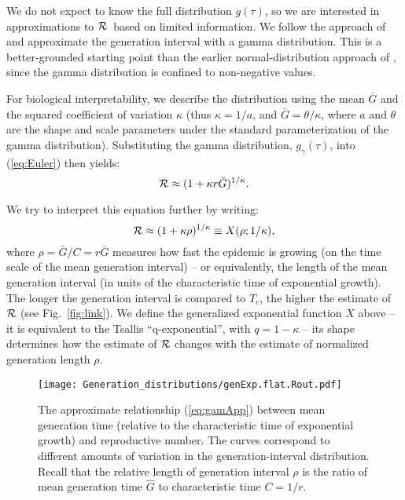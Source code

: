 \documentclass[12pt]{article}
\newcommand{\RR}{\ensuremath{{\cal R}}}
\newcommand{\Tc}{\ensuremath{C}}
\newcommand{\eref}[1]{(\ref{eq:#1})}
\newcommand{\fref}[1]{Fig.~\ref{fig:#1}}
\begin{document}
We do not expect to know the full distribution $g(\tau)$, so we are interested in approximations to \RR\ based on limited information.
We follow the approach of \cite{NishCast09} and approximate the generation interval with a gamma distribution.
This is a better-grounded starting point than the earlier normal-distribution approach of \cite{WallLips07}, since the gamma distribution is confined to non-negative values. 

For biological interpretability, we describe the distribution using the mean $\bar G$ and the squared coefficient of variation $\kappa$ (thus $\kappa = 1/a$, and $\bar G = \theta/\kappa$, where $a$ and $\theta$ are the shape and scale parameters under the standard parameterization of the gamma distribution).
Substituting the gamma distribution, $g_{\gamma}(\tau)$, into \eref{Euler} then yields:
\begin{equation}
	\RR \approx (1 + \kappa r \bar G)^{1/\kappa}.
	\label{eq:gamApp}
\end{equation}

We try to interpret this equation further by writing:
\begin{equation}
	\RR \approx (1 + \kappa \rho)^{1/\kappa} \equiv X(\rho; 1/\kappa),
	\label{eq:genExp}
\end{equation}
where $\rho = \bar G/\Tc = r\bar G$ measures how fast the epidemic is growing (on the time scale of the mean generation interval) -- or equivalently, the length of the mean generation interval (in units of the characteristic time of exponential growth).
The longer the generation interval is compared to $T_c$, the higher the estimate of $\RR$ (see \fref{link}).
We define the generalized exponential function $X$ above -- it is equivalent to the Tsallis ``q-exponential'', with $q=1-\kappa$ \cite{tsallis1994numbers} -- its shape determines how the estimate of $\RR$ changes with the estimate of normalized generation length $\rho$.

\begin{figure}[htbp]
	\centering \texttt{[image: Generation\_distributions/genExp.flat.Rout.pdf]}
	\caption{
		The approximate relationship \eref{gamApp} between mean
		generation time (relative to the characteristic time of
		exponential growth) and reproductive number. The curves correspond to different
		amounts of variation in the generation-interval
		distribution. 
		Recall that the 
		relative length of generation interval $\rho$ is the ratio of
		mean generation time $\hat G$ to characteristic time $C = 1/r$.
	} \label{fig:genExp} 
\end{figure}
\end{document}
